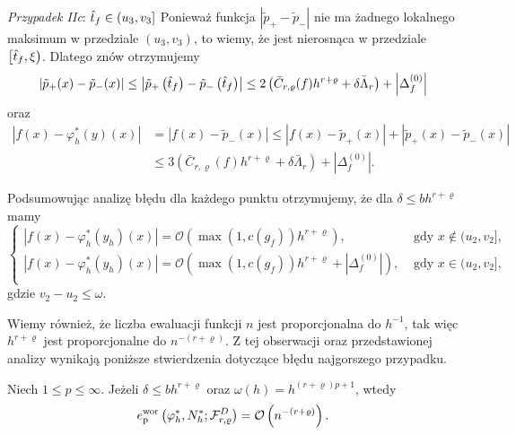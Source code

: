 \documentclass[oik, pdftex, man]{mgrwms}
\begin{document}
    \textit{Przypadek IIc}: $\hat{t}_{f} \in\left(u_{3}, v_{3}\right]$
    Ponieważ funkcja $\left|\tilde{p}_{+}-\tilde{p}_{-}\right|$ nie ma żadnego lokalnego maksimum w przedziale $\left(u_{3}, v_{3}\right)$, to wiemy, że jest nierosnąca w przedziale $\left[\hat{t}_{f}, \xi\right)$. Dlatego znów otrzymujemy
    \begin{equation*}
        \left|\tilde{p}_{+}(x)-\tilde{p}_{-}(x)\right| \leq\left|\tilde{p}_{+}\left(\hat{t}_{f}\right)-\tilde{p}_{-}\left(\hat{t}_{f}\right)\right| \leq 2\left(\bar{C}_{r, \varrho}(f) h^{r+\varrho}+\delta \bar{\Lambda}_{r}\right)+\left|\Delta_{f}^{(0)}\right|
    \end{equation*}
    oraz
    \begin{equation*}
        \begin{aligned}
            \left|f(x)-\varphi_{h}^{*}(y)(x)\right| &=\left|f(x)-\tilde{p}_{-}(x)\right| \leq\left|f(x)-\tilde{p}_{+}(x)\right|+\left|\tilde{p}_{+}(x)-\tilde{p}_{-}(x)\right| \\
            & \leq 3\left(\bar{C}_{r, \varrho}(f) h^{r+\varrho}+\delta \bar{\Lambda}_{r}\right)+\left|\Delta_{f}^{(0)}\right|.
        \end{aligned}
    \end{equation*}

    Podsumowując analizę błędu dla każdego punktu otrzymujemy, że dla $\delta \leq bh^{r+\varrho}$ mamy
    \begin{equation*}
        \begin{cases}
            |f(x) - \varphi_{h}^{*}(y_{h})(x)| = \mathcal{O} (\max(1, c(g_{f})) h^{r+\varrho}), & \text{ gdy } x \notin (u_{2}, v_{2}], \\
            |f(x) - \varphi_{h}^{*}(y_{h})(x)| = \mathcal{O} (\max(1, c(g_{f})) h^{r+\varrho} + |\Delta_{f}^{(0)}|), & \text{ gdy } x \in (u_{2}, v_{2}], \\
        \end{cases}
    \end{equation*}
    gdzie $v_{2} - u_{2} \leq \omega$.

    Wiemy również, że liczba ewaluacji funkcji $n$ jest proporcjonalna do $h^{-1}$, tak więc $h^{r+\varrho}$ jest proporcjonalne do $n^{-(r+\varrho)}$. Z tej obserwacji oraz przedstawionej analizy wynikają poniższe stwierdzenia dotyczące błędu najgorszego przypadku.

    \begin{stw}
        \label{stw2}
        Niech $1 \leq p \leq \infty$. Jeżeli $\delta \leq bh^{r+\varrho}$ oraz $\omega(h) = h^{(r+\varrho)p + 1}$, wtedy
        \begin{equation*}
            e_{\mathrm{p}}^{\mathrm{wor}}\left(\varphi_{h}^{*}, N_{h}^{*} ; \mathcal{F}_{r, \varrho}^{D}\right)=\mathcal{O}\left(n^{-(r+\varrho)}\right).
        \end{equation*}
    \end{stw}
\end{document}
